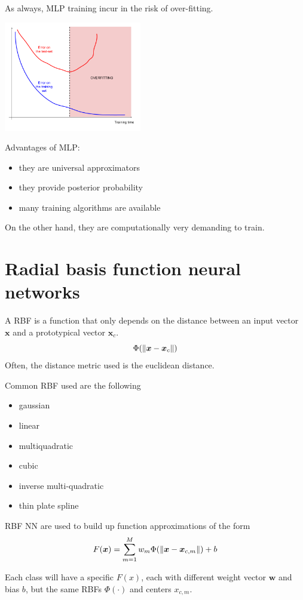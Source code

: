 \documentclass[oneside,onecolumn]{report}
\begin{document}
As always, MLP training incur in the risk of over-fitting.
\begin{center}
    \includegraphics[width=6cm]{mlp_overfitting.png}
\end{center}

Advantages of MLP:
\begin{itemize}
    \item they are universal approximators
    \item they provide posterior probability
    \item many training algorithms are available
\end{itemize}
On the other hand, they are computationally very demanding to train.


\section{Radial basis function neural networks}
A RBF is a function that only depends on the distance between an input vector $\bm x$ and a prototypical vector $\bm x_c$.
$$ \Phi(\norm{\bm x - \bm x_c}) $$
Often, the distance metric used is the euclidean distance.

Common RBF used are the following
\begin{itemize}
    \item gaussian
    \item linear
    \item multiquadratic
    \item cubic
    \item inverse multi-quadratic
    \item thin plate spline
\end{itemize}

RBF NN are used to build up function approximations of the form
$$ F(\bm x) = \sum_{m = 1}^M w_m \Phi(\norm{\bm x - \bm x_{c,m}}) + b $$

Each class will have a specific $F(x)$, each with different weight vector $\bm w$ and bias $b$, but the same RBFs $\Phi(\cdot)$ and centers $x_{c,m}$.
\end{document}

